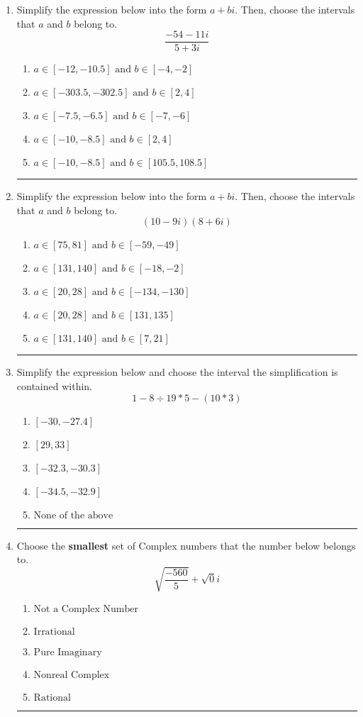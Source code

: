 \documentclass[14pt]{extbook}
\newcommand{\litem}[1]{\item#1\hspace*{-1cm}\rule{\textwidth}{0.4pt}}
\begin{document}
\begin{enumerate}
\litem{
Simplify the expression below into the form $a+bi$. Then, choose the intervals that $a$ and $b$ belong to.\[ \frac{-54 - 11 i}{5 + 3 i} \]\begin{enumerate}[label=\Alph*.]
\item \( a \in [-12, -10.5] \text{ and } b \in [-4, -2] \)
\item \( a \in [-303.5, -302.5] \text{ and } b \in [2, 4] \)
\item \( a \in [-7.5, -6.5] \text{ and } b \in [-7, -6] \)
\item \( a \in [-10, -8.5] \text{ and } b \in [2, 4] \)
\item \( a \in [-10, -8.5] \text{ and } b \in [105.5, 108.5] \)

\end{enumerate} }
\litem{
Simplify the expression below into the form $a+bi$. Then, choose the intervals that $a$ and $b$ belong to.\[ (10 - 9 i)(8 + 6 i) \]\begin{enumerate}[label=\Alph*.]
\item \( a \in [75, 81] \text{ and } b \in [-59, -49] \)
\item \( a \in [131, 140] \text{ and } b \in [-18, -2] \)
\item \( a \in [20, 28] \text{ and } b \in [-134, -130] \)
\item \( a \in [20, 28] \text{ and } b \in [131, 135] \)
\item \( a \in [131, 140] \text{ and } b \in [7, 21] \)

\end{enumerate} }
\litem{
Simplify the expression below and choose the interval the simplification is contained within.\[ 1 - 8 \div 19 * 5 - (10 * 3) \]\begin{enumerate}[label=\Alph*.]
\item \( [-30, -27.4] \)
\item \( [29, 33] \)
\item \( [-32.3, -30.3] \)
\item \( [-34.5, -32.9] \)
\item \( \text{None of the above} \)

\end{enumerate} }
\litem{
Choose the \textbf{smallest} set of Complex numbers that the number below belongs to.\[ \sqrt{\frac{-560}{5}}+\sqrt{0}i \]\begin{enumerate}[label=\Alph*.]
\item \( \text{Not a Complex Number} \)
\item \( \text{Irrational} \)
\item \( \text{Pure Imaginary} \)
\item \( \text{Nonreal Complex} \)
\item \( \text{Rational} \)


\end{enumerate}}
\end{enumerate}
\end{document}
